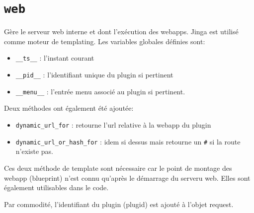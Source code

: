 \section{\lstinline|web|}

Gère le serveur web interne et dont l'exécution des webapps. Jinga est utilisé comme moteur de templating. Les variables globales définies sont:
\begin{itemize}
	\item\lstinline|__ts__| : l'instant courant
	\item\lstinline|__pid__| : l'identifiant unique du plugin si pertinent
	\item\lstinline|__menu__| : l'entrée menu associé au plugin si pertinent.
\end{itemize}
Deux méthodes ont également été ajoutée:
\begin{itemize}
	\item\lstinline|dynamic_url_for| :  retourne l'url relative à la webapp du plugin
	\item\lstinline|dynamic_url_or_hash_for| :  idem si dessus mais retourne un \lstinline|#| si la route n'existe pas.
\end{itemize}

Ces deux méthode de template sont nécessaire car le point de montage des webapp (blueprint) n'est connu qu'après le démarrage du serveru web. Elles sont également utilisables dans le code.

Par commodité, l'identifiant du plugin (plugid) est ajouté à l'objet request.

